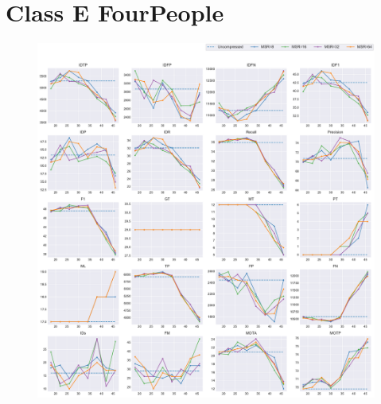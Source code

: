 
\section{Class E FourPeople}
\label{sec:appendix/FourPeople_all}


\begin{figure}[!htbp]
\centering
\includegraphics[width=1.0\linewidth]{img/appendix/FourPeople_all_multiplots_qp.pdf}
\caption[Result of all object classes in Class E FourPeople with Horizontal Axis of QP]{}
\label{fig:FourPeople_all_qp}
\end{figure}

